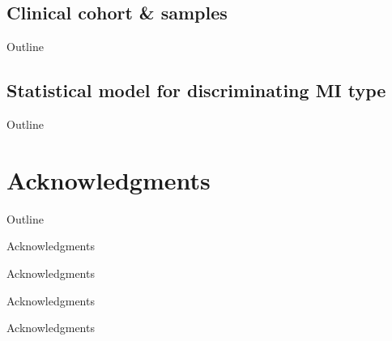 \documentclass[xcolor=dvipsnames]{beamer}
\begin{document}
\subsection{Clinical cohort \& samples}
\begin{frame}{Outline}
	\vspace{-10.5pt}
	\tableofcontents[currentsection,subsectionstyle=show/shaded/hide]
\end{frame}

\subsection{Statistical model for discriminating MI type}
\begin{frame}{Outline}
	\vspace{-10.5pt}
	\tableofcontents[currentsection,subsectionstyle=show/shaded/hide]
\end{frame}

\section{Acknowledgments}
\begin{frame}{Outline}
	\vspace{-10.5pt}
	\tableofcontents[currentsection,subsectionstyle=hide]
\end{frame}

\begin{frame}{Acknowledgments}
	\vspace{-5.5pt}
	\begin{center}
	\end{center}
\end{frame}

\begin{frame}{Acknowledgments}
	\vspace{-5.5pt}
	\begin{center}
	\end{center}
\end{frame}

\begin{frame}{Acknowledgments}
	\vspace{-5.5pt}
	\begin{center}
	\end{center}
\end{frame}

\begin{frame}{Acknowledgments}
	\vspace{-15.5pt}
	\begin{center}
	\end{center}
\end{frame}
\end{document}
